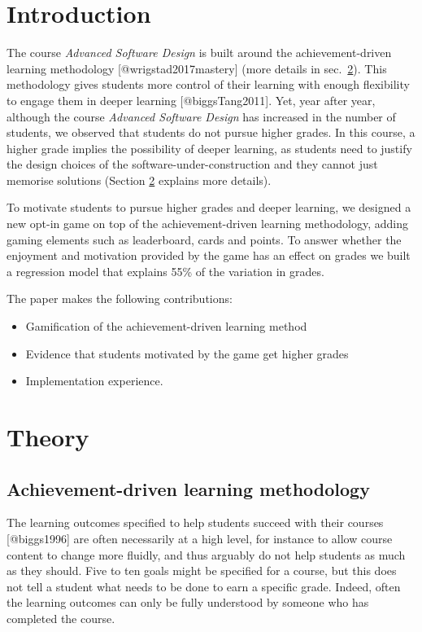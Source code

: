 \documentclass[
]{article}
\author{}
\date{}
\begin{document}
\hypertarget{introduction}{%
\section{Introduction}\label{introduction}}

The course \textit{Advanced Software Design} is built around the
achievement-driven learning methodology {[}@wrigstad2017mastery{]} (more
details in sec.~\ref{sec:theory}). This methodology gives students more
control of their learning with enough flexibility to engage them in
deeper learning {[}@biggsTang2011{]}. Yet, year after year, although the
course \textit{Advanced Software Design} has increased in the number of
students, we observed that students do not pursue higher grades. In this
course, a higher grade implies the possibility of deeper learning, as
students need to justify the design choices of the
software-under-construction and they cannot just memorise solutions
(Section \ref{sec:theory} explains more details).

To motivate students to pursue higher grades and deeper learning, we
designed a new opt-in game on top of the achievement-driven learning
methodology, adding gaming elements such as leaderboard, cards and
points. To answer whether the enjoyment and motivation provided by the
game has an effect on grades we built a regression model that explains
55\% of the variation in grades.

The paper makes the following contributions:

\begin{itemize}
\item Gamification of the achievement-driven learning method
\item Evidence that students motivated by the game get higher grades
\item Implementation experience.
\end{itemize}

\hypertarget{sec:theory}{%
\section{Theory}\label{sec:theory}}

\hypertarget{sec:achievement-driven}{%
\subsection{Achievement-driven learning
methodology}\label{sec:achievement-driven}}

The learning outcomes specified to help students succeed with their
courses {[}@biggs1996{]} are often necessarily at a high level, for
instance to allow course content to change more fluidly, and thus
arguably do not help students as much as they should. Five to ten goals
might be specified for a course, but this does not tell a student what
needs to be done to earn a specific grade. Indeed, often the learning
outcomes can only be fully understood by someone who has completed the
course.
\end{document}
